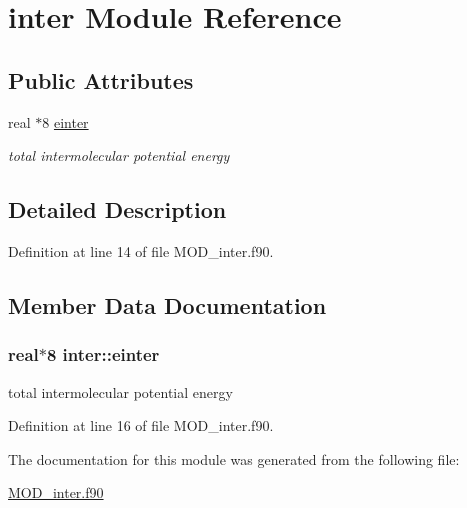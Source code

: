 \hypertarget{classinter}{\section{inter Module Reference}
\label{classinter}
}
\subsection*{Public Attributes}
\begin{DoxyCompactItemize}
\item 
real $\ast$8 \hyperlink{classinter_a1bf718d4a8d4cbe4fc5afca9c5f2d788}{einter}
\begin{DoxyCompactList}\small\item\em total intermolecular potential energy \end{DoxyCompactList}\end{DoxyCompactItemize}


\subsection{Detailed Description}


Definition at line 14 of file M\-O\-D\-\_\-inter.\-f90.



\subsection{Member Data Documentation}
\hypertarget{classinter_a1bf718d4a8d4cbe4fc5afca9c5f2d788}{
\subsubsection[{einter}]{\setlength{\rightskip}{0pt plus 5cm}real$\ast$8 inter\-::einter}}\label{classinter_a1bf718d4a8d4cbe4fc5afca9c5f2d788}


total intermolecular potential energy 



Definition at line 16 of file M\-O\-D\-\_\-inter.\-f90.



The documentation for this module was generated from the following file\-:\begin{DoxyCompactItemize}
\item 
\hyperlink{MOD__inter_8f90}{M\-O\-D\-\_\-inter.\-f90}\end{DoxyCompactItemize}
